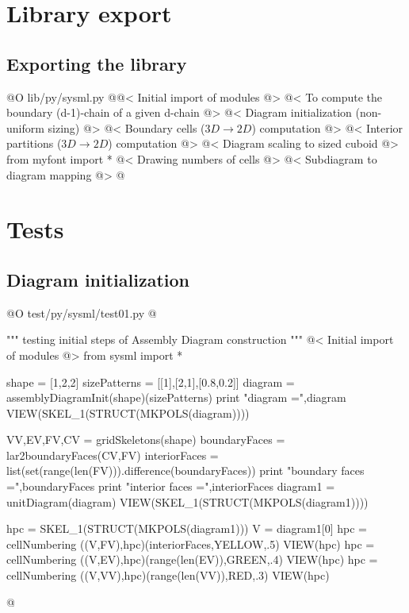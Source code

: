 \documentclass[11pt,oneside]{article}	%
\begin{document}
\section{Library export}
\subsection{Exporting the library}

@O lib/py/sysml.py
@{@< Initial import of modules @>
@< To compute the boundary (d-1)-chain of a given d-chain @>
@< Diagram initialization (non-uniform sizing) @>
@< Boundary cells ($3D\to 2D$) computation @>
@< Interior partitions ($3D\to 2D$) computation @>
@< Diagram scaling to sized cuboid @>
from myfont import *
@< Drawing numbers of cells @>
@< Subdiagram to diagram mapping @>
@}

\section{Tests}
\subsection{Diagram initialization}

@O test/py/sysml/test01.py
@{""" testing initial steps of Assembly Diagram construction """
@< Initial import of modules @>
from sysml import *

shape = [1,2,2]
sizePatterns = [[1],[2,1],[0.8,0.2]]
diagram = assemblyDiagramInit(shape)(sizePatterns)
print "\n diagram =",diagram
VIEW(SKEL_1(STRUCT(MKPOLS(diagram))))

VV,EV,FV,CV = gridSkeletons(shape)
boundaryFaces = lar2boundaryFaces(CV,FV)
interiorFaces = list(set(range(len(FV))).difference(boundaryFaces))
print "\n boundary faces =",boundaryFaces
print "\n interior faces =",interiorFaces
diagram1 = unitDiagram(diagram)
VIEW(SKEL_1(STRUCT(MKPOLS(diagram1))))

hpc = SKEL_1(STRUCT(MKPOLS(diagram1)))
V = diagram1[0]
hpc = cellNumbering ((V,FV),hpc)(interiorFaces,YELLOW,.5)
VIEW(hpc)
hpc = cellNumbering ((V,EV),hpc)(range(len(EV)),GREEN,.4)
VIEW(hpc)
hpc = cellNumbering ((V,VV),hpc)(range(len(VV)),RED,.3)
VIEW(hpc)

@}
\end{document}
